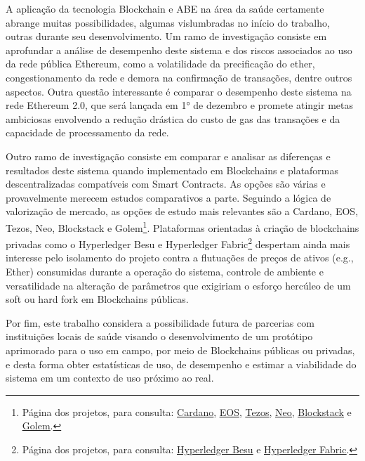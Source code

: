 \documentclass[a4paper,11pt]{article}
\newcommand{\link}[2]{{\color{blue}\underline{\href{#1}{#2}}}}
\begin{document}
A aplicação da tecnologia Blockchain e ABE na área da saúde certamente abrange muitas possibilidades, algumas vislumbradas no início do trabalho, outras durante seu desenvolvimento.
Um ramo de investigação consiste em aprofundar a análise de desempenho deste sistema e dos riscos associados ao uso da rede pública Ethereum, como a volatilidade da precificação do ether, congestionamento da rede e demora na confirmação de transações, dentre outros aspectos.
Outra questão interessante é comparar o desempenho deste sistema na rede Ethereum 2.0, que será lançada em 1° de dezembro e promete atingir metas ambiciosas envolvendo a redução drástica do custo de gas das transações e da capacidade de processamento da rede.

Outro ramo de investigação  consiste em comparar e analisar as diferenças e resultados deste sistema quando implementado em Blockchains e plataformas descentralizadas compatíveis com Smart Contracts.
As opções são várias e provavelmente merecem estudos comparativos a parte.
Seguindo a lógica de valorização de mercado, as opções de estudo mais relevantes são a Cardano, EOS, Tezos, Neo, Blockstack e Golem\footnote{Página dos projetos, para consulta: \link{https://cardano.org/}{Cardano}, \link{https://eos.io/}{EOS}, \link{https://tezos.com/}{Tezos}, \link{https://neo.org/}{Neo}, \link{https://www.blockstack.org/}{Blockstack} e \link{https://golem.network/}{Golem}.}.
Plataformas orientadas à criação de blockchains privadas como o Hyperledger Besu e Hyperledger Fabric\footnote{Página dos projetos, para consulta: \link{https://www.hyperledger.org/use/besu}{Hyperledger Besu} e \link{https://www.hyperledger.org/use/fabric}{Hyperledger Fabric}.} despertam ainda mais interesse pelo isolamento do projeto contra a flutuações de preços de ativos (e.g., Ether) consumidas durante a operação do sistema, controle de ambiente e versatilidade na alteração de parâmetros que exigiriam o esforço hercúleo de um soft ou hard fork em Blockchains públicas.

Por fim, este trabalho considera a possibilidade futura de parcerias com instituições locais de saúde visando o desenvolvimento de um protótipo aprimorado para o uso em campo, por meio de Blockchains públicas ou privadas, e desta forma obter estatísticas de uso, de desempenho e estimar a viabilidade do sistema em um contexto de uso próximo ao real.

\newpage



\appendix
\end{document}
